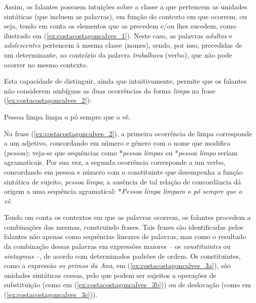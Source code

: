 \documentclass[output=paper]{LSP/langsci}
\begin{document}
Assim, os falantes possuem intuições sobre a classe a que pertencem as unidades sintáticas (que incluem as palavras), em função do contexto em que ocorrem, ou seja, tendo em conta os elementos que as precedem e/ou lhes sucedem, como ilustrado em (\ref{ex:costacostagoncalves_1}). Neste caso, as palavras \textit{adultos} e \textit{adolescentes} pertencem à mesma classe (nomes), sendo, por isso, precedidas de um determinante, ao contrário da palavra \textit{trabalhava} (verbo), que não pode ocorrer no mesmo contexto.

\ea\label{ex:costacostagoncalves_1}
\zl

Esta capacidade de distinguir, ainda que intuitivamente,  permite que os falantes não considerem ambíguas as duas ocorrências da forma \textit{limpa} na frase (\ref{ex:costacostagoncalves_2}):

\ea\label{ex:costacostagoncalves_2} Pessoa limpa limpa o pó sempre que o vê.\z

Na frase (\ref{ex:costacostagoncalves_2}), a primeira ocorrência de limpa corresponde a um adjetivo, concordando em número e género com o nome que modifica (\textit{pessoa}); veja-se que sequências como *\textit{pessoa limpas} ou *\textit{pessoa limpo} seriam agramaticais. Por sua vez, a segunda ocorrência corresponde a um verbo, concordando em pessoa e número com o constituinte que desempenha a função sintática de sujeito, \textit{pessoa limpa}; a ausência de tal relação de concordância dá origem a uma sequência agramatical: *\textit{Pessoa limpa limpam o pó sempre que o vê}. 

Tendo em conta os contextos em que as palavras ocorrem, os falantes procedem a combinações das mesmas, construindo frases. Tais frases são identificadas pelos falantes não apenas como sequências lineares de palavras, mas como o resultado da combinação dessas palavras em expressões maiores – os \textit{constituintes} ou \textit{sintagmas} –, de acordo com determinados padrões de ordem. Os constituintes, como a expressão \textit{os primos da Ana}, em (\ref{ex:costacostagoncalves_3a}), são unidades sintáticas coesas, pelo que podem ser sujeitos a operações de substituição (como em (\ref{ex:costacostagoncalves_3b})) ou de deslocação (como em (\ref{ex:costacostagoncalves_3c})).
\end{document}
